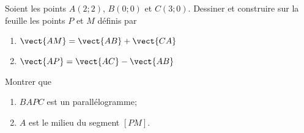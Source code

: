 
\begin{exercice}\label{exosmath-0701}

\begin{wrapfigure}{r}{8.0cm}
   \vspace{-0.5cm}        %
   \centering
   
\end{wrapfigure}

    Soient les points \( A(2;2)\), \( B(0;0)\) et \( C(3;0)\). Dessiner et construire sur la feuille les points \( P\) et \( M\) définis par
    \begin{enumerate}
        \item
            $\vect{ AM }=\vect{ AB }+\vect{ CA }$
        \item
            $\vect{ AP }=\vect{ AC }-\vect{ AB }$
    \end{enumerate}
    Montrer que
    \begin{enumerate}
        \item
            \( BAPC\) est un parallélogramme;
        \item
            \( A\) est le milieu du segment \( [PM]\).
    \end{enumerate}


\end{exercice}
